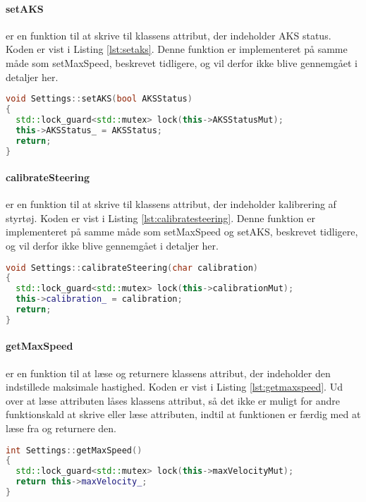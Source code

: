 \paragraph{setAKS} er en funktion til at skrive til klassens attribut, der indeholder AKS status. Koden er vist i Listing \ref{lst:setaks}. Denne funktion er implementeret på samme måde som setMaxSpeed, beskrevet tidligere, og vil derfor ikke blive gennemgået i detaljer her.

\begin{lstlisting}[caption={Funktionen setAKS},label=lst:setaks, language=c++]
void Settings::setAKS(bool AKSStatus)
{
  std::lock_guard<std::mutex> lock(this->AKSStatusMut);
  this->AKSStatus_ = AKSStatus;
  return;
}
\end{lstlisting}

\clearpage

\paragraph{calibrateSteering} er en funktion til at skrive til klassens attribut, der indeholder kalibrering af styrtøj. Koden er vist i Listing \ref{lst:calibratesteering}. Denne funktion er implementeret på samme måde som setMaxSpeed og setAKS, beskrevet tidligere, og vil derfor ikke blive gennemgået i detaljer her.

\begin{lstlisting}[caption={Funktionen calibrateSteering},label=lst:calibratesteering, language=c++]
void Settings::calibrateSteering(char calibration)
{
  std::lock_guard<std::mutex> lock(this->calibrationMut);
  this->calibration_ = calibration;
  return;
}
\end{lstlisting}


\paragraph{getMaxSpeed}  er en funktion til at læse og returnere klassens attribut, der indeholder den indstillede maksimale hastighed. Koden er vist i Listing \ref{lst:getmaxspeed}. Ud over at læse attributen låses klassens attribut, så det ikke er muligt for andre funktionskald at skrive eller læse attributen, indtil at funktionen er færdig med at læse fra og returnere den.

\begin{lstlisting}[caption={Funktionen getMaxSpeed},label=lst:getmaxspeed, language=c++]
int Settings::getMaxSpeed()
{
  std::lock_guard<std::mutex> lock(this->maxVelocityMut);
  return this->maxVelocity_;
}
\end{lstlisting}


